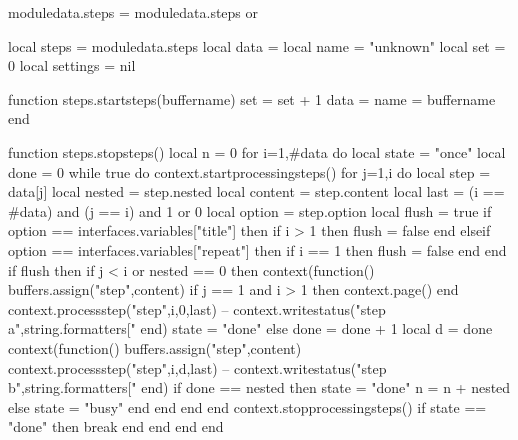 


\unprotect

\startluacode

moduledata.steps = moduledata.steps or { }

local steps      = moduledata.steps
local data       = { }
local name       = "unknown"
local set        = 0
local settings   = nil

function steps.startsteps(buffername)
    set  = set + 1
    data = { }
    name = buffername
end

function steps.stopsteps()
    local n = 0
    for i=1,#data do
        local state = "once"
        local done  = 0
        while true do
            context.startprocessingsteps()
            for j=1,i do
                local step    = data[j]
                local nested  = step.nested
                local content = step.content
                local last    = (i == #data) and (j == i) and 1 or 0
                local option = step.option
                local flush  = true
                if option == interfaces.variables["title"] then
                    if i > 1 then
                        flush = false
                    end
                elseif option == interfaces.variables["repeat"] then
                    if i == 1 then
                        flush = false
                    end
                end
                if flush then
                    if j < i or nested == 0 then
                        context(function()
														buffers.assign("step",content)
                            if j == 1 and i > 1 then
																context.page()
														end
														context.processstep("step",i,0,last)
														-- context.writestatus("step a",string.formatters["%
                        end)
                        state = "done"
                    else
                        done = done + 1
                        local d = done
                        context(function()
                            buffers.assign("step",content)
                            context.processstep("step",i,d,last)
                        --  context.writestatus("step b",string.formatters["%
                        end)
                        if done == nested then
                            state = "done"
                            n = n + nested
                        else
                            state = "busy"
                        end
                    end
                end
            end
            context.stopprocessingsteps()
            if state == "done" then
                break
            end
        end
    end
end

